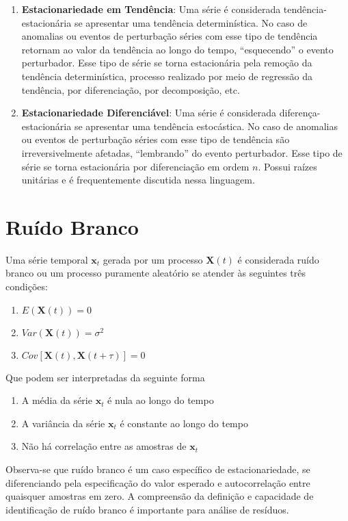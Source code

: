 \begin{enumerate}
    \item \textbf{Estacionariedade em Tendência}: Uma série é considerada
        tendência-estacionária se apresentar uma tendência determinística. No
        caso de anomalias ou eventos de perturbação séries com esse tipo de
        tendência retornam ao valor da tendência ao longo do tempo,
        ``esquecendo'' o evento perturbador. Esse tipo de série se torna
        estacionária pela remoção da tendência determinística, processo
        realizado por meio de regressão da tendência, por diferenciação, por
        decomposição, etc.
    \item \textbf{Estacionariedade Diferenciável}: Uma série é considerada
        diferença-estacionária se apresentar uma tendência estocástica. No
        caso de anomalias ou eventos de perturbação séries com esse tipo de
        tendência são irreversivelmente afetadas,
        ``lembrando'' do evento perturbador. Esse tipo de série se torna
        estacionária por diferenciação em ordem $n$. Possui raízes unitárias
        e é frequentemente discutida nessa linguagem.

\end{enumerate}

\section{Ruído Branco}\label{sec:white_noise}

Uma série temporal $\mathbf{x}_t$ gerada por um processo $\mathbf{X}(t)$ é
considerada ruído branco ou um processo puramente aleatório se atender às
seguintes três condições:

\begin{enumerate}
    \item $E(\mathbf{X}(t)) = 0$
    \item $Var(\mathbf{X}(t)) = \sigma^2$
    \item $Cov[\mathbf{X}(t), \mathbf{X}(t+\tau)] = 0$
\end{enumerate}\vspace{.5cm}

Que podem ser interpretadas da seguinte forma

\begin{enumerate}
    \item A média da série $\mathbf{x}_t$ é nula ao longo do tempo
    \item A variância da série $\mathbf{x}_t$ é constante ao longo do tempo
    \item Não há correlação entre as amostras de $\mathbf{x}_t$
\end{enumerate}\vspace{.5cm}

Observa-se que ruído branco é um caso específico de estacionariedade, se
diferenciando pela especificação do valor esperado e autocorrelação entre
quaisquer amostras em zero. A compreensão da definição e capacidade de
identificação de ruído branco é importante para análise de resíduos.
